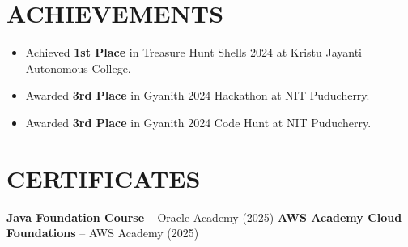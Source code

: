 \documentclass[10pt,a4paper]{article}
\begin{document}
\section*{ACHIEVEMENTS}

\begin{itemize}

\item Achieved \textbf{1st Place} in Treasure Hunt Shells 2024 at Kristu Jayanti Autonomous College.

\item Awarded \textbf{3rd Place} in Gyanith 2024 Hackathon at NIT Puducherry.

\item Awarded \textbf{3rd Place} in Gyanith 2024 Code Hunt at NIT Puducherry.

\end{itemize}


\section*{CERTIFICATES}
\small
\textbf{Java Foundation Course} -- Oracle Academy (2025)
\hfill
\textbf{AWS Academy Cloud Foundations} -- AWS Academy (2025)
\end{document}
